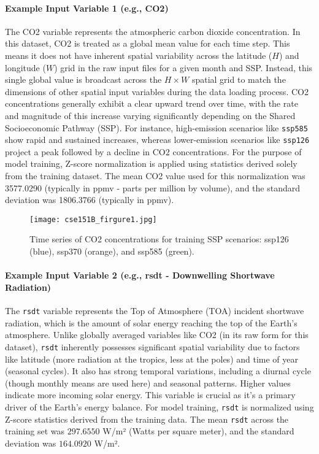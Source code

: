 \documentclass{article}
\begin{document}
\paragraph{Example Input Variable 1 (e.g., CO2)}
The CO2 variable represents the atmospheric carbon dioxide concentration. In this dataset, CO2 is treated as a global mean value for each time step. This means it does not have inherent spatial variability across the latitude (\(H\)) and longitude (\(W\)) grid in the raw input files for a given month and SSP. Instead, this single global value is broadcast across the \(H \times W\) spatial grid to match the dimensions of other spatial input variables during the data loading process. CO2 concentrations generally exhibit a clear upward trend over time, with the rate and magnitude of this increase varying significantly depending on the Shared Socioeconomic Pathway (SSP). For instance, high-emission scenarios like \texttt{ssp585} show rapid and sustained increases, whereas lower-emission scenarios like \texttt{ssp126} project a peak followed by a decline in CO2 concentrations. For the purpose of model training, Z-score normalization is applied using statistics derived solely from the training dataset. The mean CO2 value used for this normalization was 3577.0290 (typically in ppmv - parts per million by volume), and the standard deviation was 1806.3766 (typically in ppmv).

\begin{figure}[h!]
  \centering
  \texttt{[image: cse151B\_firgure1.jpg]} 
  \caption{Time series of CO2 concentrations for training SSP scenarios: ssp126 (blue), ssp370 (orange), and ssp585 (green).}
  \label{fig:co2_visualization}
\end{figure}

\paragraph{Example Input Variable 2 (e.g., rsdt - Downwelling Shortwave Radiation)}
The \texttt{rsdt} variable represents the Top of Atmosphere (TOA) incident shortwave radiation, which is the amount of solar energy reaching the top of the Earth's atmosphere. Unlike globally averaged variables like CO2 (in its raw form for this dataset), \texttt{rsdt} inherently possesses significant spatial variability due to factors like latitude (more radiation at the tropics, less at the poles) and time of year (seasonal cycles). It also has strong temporal variations, including a diurnal cycle (though monthly means are used here) and seasonal patterns. Higher values indicate more incoming solar energy. This variable is crucial as it's a primary driver of the Earth's energy balance. For model training, \texttt{rsdt} is normalized using Z-score statistics derived from the training data. The mean \texttt{rsdt} across the training set was \(297.6550\) W/m² (Watts per square meter), and the standard deviation was \(164.0920\) W/m².
\end{document}
